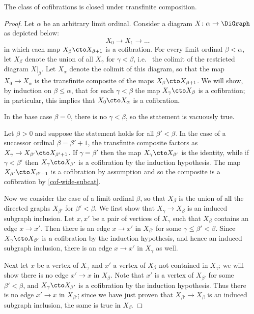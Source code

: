 \begin{proposition}\label{closed-under-transf-comp}
The class of cofibrations is closed under transfinite composition.
\end{proposition}

\begin{proof}
Let $\alpha$ be an arbitrary limit ordinal. Consider a diagram $X \colon \alpha \to \DiGraph$ as depicted below:
\[
X_0 \to X_1 \to \ldots
\]
in which each map $X_\beta \cto X_{\beta+1}$
is a cofibration. For every limit ordinal $\beta < \alpha$, let $X_\beta$ denote the union of all $X_\gamma$ for $\gamma < \beta$, i.e.~ the colimit of the restricted diagram $X|_{\beta}$. Let $X_\alpha$ denote the colimit of this diagram, so that the map $X_0 \to X_\alpha$ is the transfinite composite of the maps $X_{\beta} \cto X_{\beta + 1}$. We will show, by induction on $\beta \leq \alpha$, that for each $\gamma < \beta$ the map $X_\gamma  \cto X_\beta$ is a cofibration; in particular, this implies that $X_0 \cto X_\alpha$ is a cofibration.

In the base case $\beta = 0$, there is no $\gamma < \beta$, so the statement is vacuously true.

Let $\beta > 0$ and suppose the statement holds for all $\beta' < \beta$. In the case of a successor ordinal $\beta = \beta' + 1$, the transfinite composite factors as $X_\gamma \to X_{\beta'} \cto X_{\beta' + 1}$.
If $\gamma = \beta'$ then the map $X_\gamma \cto X_{\beta'}$ is the identity, while if $\gamma < \beta'$ then $X_\gamma \cto X_{\beta'}$ is a cofibration by the induction hypothesis. The map $X_{\beta'} \cto X_{\beta' + 1}$ is a cofibration by assumption and so the composite is a cofibration by \cref{cof-wide-subcat}.

Now we consider the case of a limit ordinal $\beta$, so that $X_\beta$ is the union of all the directed graphs $X_{\beta'}$ for $\beta' < \beta$. We first show that $X_\gamma \to X_\beta$ is an induced subgraph inclusion. Let $x, x'$ be a pair of vertices of $X_\gamma$ such that $X_\beta$ contains an edge $x \to x'$. Then there is an edge $x \to x'$ in $X_{\beta'}$ for some $\gamma \leq \beta' < \beta$. Since $X_\gamma \cto X_{\beta'}$ is a cofibration by the induction hypothesis, and hence an induced subgraph inclusion, there is an edge $x \to x'$ in $X_\gamma$ as well.

Next let $x$ be a vertex of $X_\gamma$ and $x'$ a vertex of $X_\beta$ not contained in $X_\gamma$; we will show there is no edge $x' \to x$ in $X_\beta$. Note that $x'$ is a vertex of $X_{\beta'}$ for some $\beta' < \beta$, and $X_\gamma \cto X_{\beta'}$ is a cofibration by the induction hypothesis. Thus there is no edge $x' \to x$ in $X_{\beta'}$; since we have just proven that $X_{\beta'} \to X_\beta$ is an induced subgraph inclusion, the same is true in $X_\beta$.


\end{proof}
